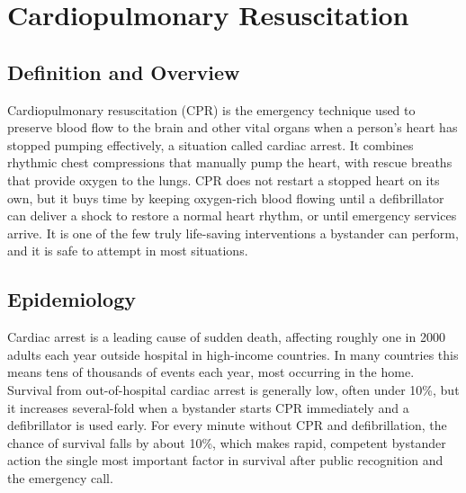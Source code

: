 \chapter{Cardiopulmonary Resuscitation}

\section*{Definition and Overview}
Cardiopulmonary resuscitation (CPR) is the emergency technique used to preserve blood flow to the brain and other vital organs when a person's heart has stopped pumping effectively, a situation called cardiac arrest. It combines rhythmic chest compressions that manually pump the heart, with rescue breaths that provide oxygen to the lungs. CPR does not restart a stopped heart on its own, but it buys time by keeping oxygen-rich blood flowing until a defibrillator can deliver a shock to restore a normal heart rhythm, or until emergency services arrive. It is one of the few truly life-saving interventions a bystander can perform, and it is safe to attempt in most situations.

\section*{Epidemiology}
Cardiac arrest is a leading cause of sudden death, affecting roughly one in 2000 adults each year outside hospital in high-income countries. In many countries this means tens of thousands of events each year, most occurring in the home. Survival from out-of-hospital cardiac arrest is generally low, often under 10\%, but it increases several-fold when a bystander starts CPR immediately and a defibrillator is used early. For every minute without CPR and defibrillation, the chance of survival falls by about 10\%, which makes rapid, competent bystander action the single most important factor in survival after public recognition and the emergency call.

